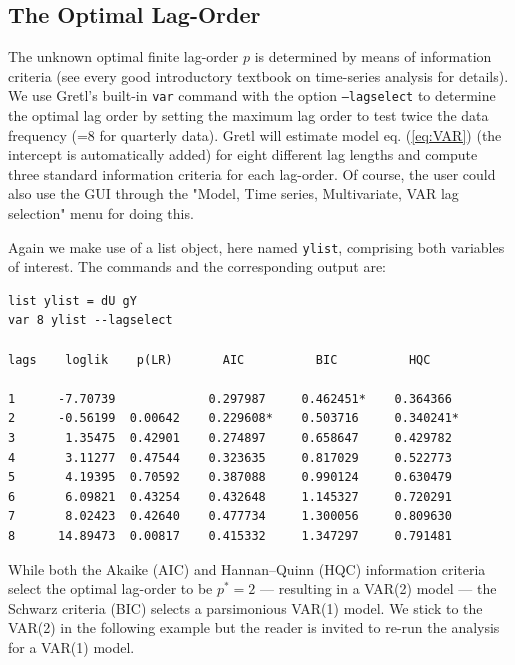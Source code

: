 \documentclass[11pt]{article}
\begin{document}
\subsection{The Optimal Lag-Order}
The unknown optimal finite lag-order $ p $ is determined by means of information criteria (see every good introductory textbook on time-series analysis for details). We use Gretl's built-in \texttt{var} command with the option \texttt{---lagselect} to determine the optimal lag order by setting the maximum lag order to test twice the data frequency (=8 for quarterly data). Gretl will estimate model eq. (\ref{eq:VAR}) (the intercept is automatically added) for eight different lag lengths and compute three standard information criteria for each lag-order. Of course, the user could also use the GUI through the "Model, Time series, Multivariate, VAR lag selection" menu for doing this.

Again we make use of a list object, here named \texttt{ylist}, comprising both variables of interest. The commands and the corresponding output are:
\begin{Verbatim}[baselinestretch=0.75, fontsize=\small]
list ylist = dU gY
var 8 ylist --lagselect

lags    loglik    p(LR)       AIC          BIC          HQC

1      -7.70739             0.297987     0.462451*    0.364366 
2      -0.56199  0.00642    0.229608*    0.503716     0.340241*
3       1.35475  0.42901    0.274897     0.658647     0.429782 
4       3.11277  0.47544    0.323635     0.817029     0.522773 
5       4.19395  0.70592    0.387088     0.990124     0.630479 
6       6.09821  0.43254    0.432648     1.145327     0.720291 
7       8.02423  0.42640    0.477734     1.300056     0.809630 
8      14.89473  0.00817    0.415332     1.347297     0.791481 
\end{Verbatim}
While both the Akaike (AIC) and Hannan–Quinn (HQC) information criteria select the optimal lag-order to be $ p^\ast = 2 $ --- resulting in a VAR(2) model --- the Schwarz criteria  (BIC) selects a parsimonious VAR(1) model. We stick to the VAR(2) in the following example but the reader is invited to re-run the analysis for a VAR(1) model.
\end{document}
